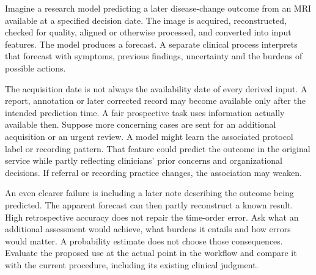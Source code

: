 \biomedicalanswer
{}
Imagine a research model predicting a later disease-change outcome from an MRI available at a specified decision date. The image is acquired, reconstructed, checked for quality, aligned or otherwise processed, and converted into input features. The model produces a forecast. A separate clinical process interprets that forecast with symptoms, previous findings, uncertainty and the burdens of possible actions.

The acquisition date is not always the availability date of every derived input. A report, annotation or later corrected record may become available only after the intended prediction time. A fair prospective task uses information actually available then.
Suppose more concerning cases are sent for an additional acquisition or an urgent review. A model might learn the associated protocol label or recording pattern. That feature could predict the outcome in the original service while partly reflecting clinicians' prior concerns and organizational decisions. If referral or recording practice changes, the association may weaken.

An even clearer failure is including a later note describing the outcome being predicted. The apparent forecast can then partly reconstruct a known result. High retrospective accuracy does not repair the time-order error.
Ask what an additional assessment would achieve, what burdens it entails and how errors would matter. A probability estimate does not choose those consequences. Evaluate the proposed use at the actual point in the workflow and compare it with the current procedure, including its existing clinical judgment.


